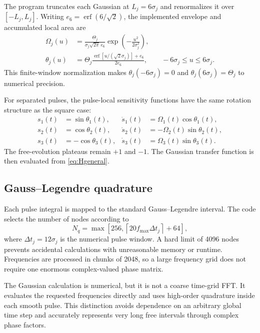 \documentclass[11pt,a4paper]{article}
\begin{document}
The program truncates each Gaussian at $L_j=6\sigma_j$ and renormalizes it over $[-L_j,L_j]$. Writing $e_6=\operatorname{erf}(6/\sqrt{2})$, the implemented envelope and accumulated local area are
\begin{align}
\Omega_j(u)&=\frac{\Theta_j}{\sigma_j\sqrt{2\pi}\,e_6}
\exp\left(-\frac{u^2}{2\sigma_j^2}\right),\\
\theta_j(u)&=\Theta_j\frac{\operatorname{erf}[u/(\sqrt{2}\sigma_j)]+e_6}{2e_6},
\qquad -6\sigma_j\leq u\leq6\sigma_j.
\label{eq:gaussianArea}
\end{align}
This finite-window normalization makes $\theta_j(-6\sigma_j)=0$ and $\theta_j(6\sigma_j)=\Theta_j$ to numerical precision.

For separated pulses, the pulse-local sensitivity functions have the same rotation structure as the square case:
\begin{align}
s_1(t)&=\sin\theta_1(t), & \dot{s}_1(t)&=\Omega_1(t)\cos\theta_1(t),\\
s_2(t)&=\cos\theta_2(t), & \dot{s}_2(t)&=-\Omega_2(t)\sin\theta_2(t),\\
s_3(t)&=-\cos\theta_3(t), & \dot{s}_3(t)&=\Omega_3(t)\sin\theta_3(t).
\end{align}
The free-evolution plateaus remain $+1$ and $-1$. The Gaussian transfer function is then evaluated from \cref{eq:Hgeneral}.

\subsection{Gauss--Legendre quadrature}

Each pulse integral is mapped to the standard Gauss--Legendre interval. The code selects the number of nodes according to
\begin{equation}
N_q=\max\!\left[256,\left\lceil20f_{\max}\Delta t_j\right\rceil+64\right],
\end{equation}
where $\Delta t_j=12\sigma_j$ is the numerical pulse window. A hard limit of 4096 nodes prevents accidental calculations with unreasonable memory or runtime. Frequencies are processed in chunks of 2048, so a large frequency grid does not require one enormous complex-valued phase matrix.

The Gaussian calculation is numerical, but it is not a coarse time-grid FFT. It evaluates the requested frequencies directly and uses high-order quadrature inside each smooth pulse. This distinction avoids dependence on an arbitrary global time step and accurately represents very long free intervals through complex phase factors.
\end{document}
